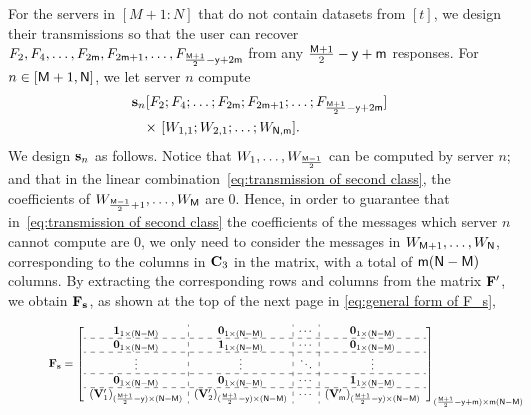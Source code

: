 \documentclass[conference,letterpaper]{IEEEtran}
\begin{document}
For the servers in $[M+1 : N]$ that do not contain datasets from $[t]$, we design their transmissions so that the user can recover $F_2, F_4, \ldots, F_{2{\sf m}}, F_{2{\sf m}+1}, \ldots, F_{\frac{{\sf M}+1}{2} - {\sf y} + 2{\sf m}}$ from any $\frac{{\sf M}+1}{2} - {\sf y} + {\sf m}$ responses.
 For $n \in [{\sf M}+1, {\sf N}]$, we let server $n$ compute
\begin{align}
{\bf s}_n  & [ F_2; F_4; \ldots; F_{2{\sf m}}; F_{2{\sf m}+1}; \ldots; F_{\frac{{\sf M}+1}{2} - {\sf y} + 2{\sf m}} ]  \nonumber \\
& \text{× }  [ W_{1,1}; W_{2,1}; \ldots; W_{{\sf N},{\sf m}} ] .
\label{eq:transmission of second class}
\end{align}
We design ${\bf s}_{n} $ as follows.
Notice that $W_1, \ldots, W_{\frac{{\sf M}-1}{2}}$ can be computed by server $n$; and that in the linear combination~\eqref{eq:transmission of second class}, the coefficients of $W_{\frac{{\sf M}-1}{2}+1}, \ldots, W_{{\sf M}}$ are $0$. 
Hence, in order to guarantee that in~\eqref{eq:transmission of second class} the coefficients of the messages which server $n$ cannot compute are $0$, we only need to consider the messages in $W_{{\sf M}+1}, \ldots, W_{{\sf N}}$, corresponding to the columns in ${\bf C}_3$ in the matrix, with a total of ${\sf m} ({\sf N} - {\sf M})$ columns.
By extracting the corresponding rows and columns from the matrix \( {\bf F}' \), we obtain \( {\bf F}_{\bf s} \), as shown at the top of the next page in \eqref{eq:general form of F_s},
\begin{figure}
\begin{equation}
\scalebox{0.8}{$
 {\bf F}_{\bf s} = 
\left[
\begin{array}{c:c:c:c}
{\bf 1}_{1 \times (\Nsf-\Msf)}  & {\bf 0}_{1 \times (\Nsf-\Msf)}  & \cdots & {\bf 0}_{1 \times (\Nsf-\Msf)}   \\ \hdashline
{\bf 0}_{1 \times (\Nsf-\Msf)} &  {\bf 1}_{1 \times (\Nsf-\Msf)}   & \cdots & {\bf 0}_{1 \times (\Nsf-\Msf)}   \\ \hdashline 
 \vdots   & \vdots  &  \ddots & \vdots \\ \hdashline
 {\bf 0}_{1 \times (\Nsf-\Msf)} &   {\bf 0}_{1 \times (\Nsf-\Msf)}    & \cdots &  {\bf 1}_{1 \times (\Nsf-\Msf)} \\ \hdashline
 ({\bf V}'_{1})_{ (\frac{\Msf + 1}{2} - \ysf) \times (\Nsf-\Msf)}  &  ({\bf V}'_{2})_{ (\frac{\Msf + 1}{2} - \ysf) \times (\Nsf-\Msf)}  &   \cdots   &   ({\bf V}'_{\msf})_{ (\frac{\Msf + 1}{2} - \ysf) \times (\Nsf-\Msf)} 
 \end{array}
\right]_{(\frac{\Msf + 1}{2} - \ysf + \msf) \times \msf(\Nsf-\Msf)}
$}
\label{eq:general form of F_s}
\end{equation}

\end{figure}
\end{document}
